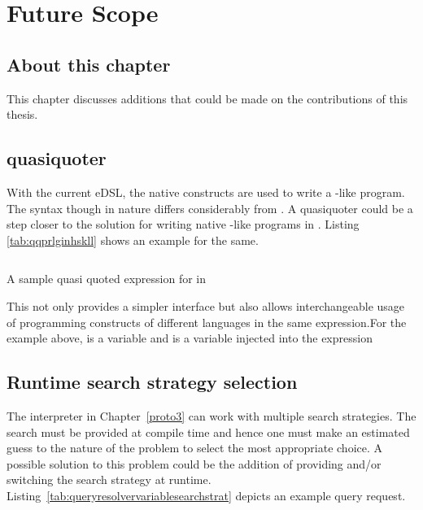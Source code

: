 \documentclass[thesis-solanki.tex]{subfiles}
\begin{document}
\chapter{Future Scope}\label{chap:futureScope}


\section{About this chapter}
This chapter discusses additions that could be made on the contributions of this thesis.


\section{ quasiquoter}
With the current eDSL, the native  constructs are used to write a -like program. The syntax though
 in nature differs considerably from . A quasiquoter could be a step closer to the solution for writing
native -like programs in . Listing ~ \ref{tab:qqprlginhskll} shows an example for the same.

\begin{code-list}[H]
\begin{singlespace}
\inputminted{haskell}{haskell-proto4-qq-prlg-in-hskll.hs}
\end{singlespace}
\caption{A sample quasi quoted expression for  in }
\label{tab:qqprlginhskll}
\end{code-list}

This not only provides a simpler interface but also allows interchangeable usage of programming constructs of different languages in the 
same expression.For the example above,  is a   variable and  is a 
 variable injected into the expression 

\section{Runtime search strategy selection}
The  interpreter in Chapter~\ref{proto3} can work with multiple search strategies. The search must be provided at compile
time and hence one must make an estimated guess to the nature of the problem to select the most appropriate choice. A possible solution
to this problem could be the addition of providing and/or switching the search strategy at runtime. 
Listing~\ref{tab:queryresolvervariablesearchstrat} depicts an example query request.
\end{document}
